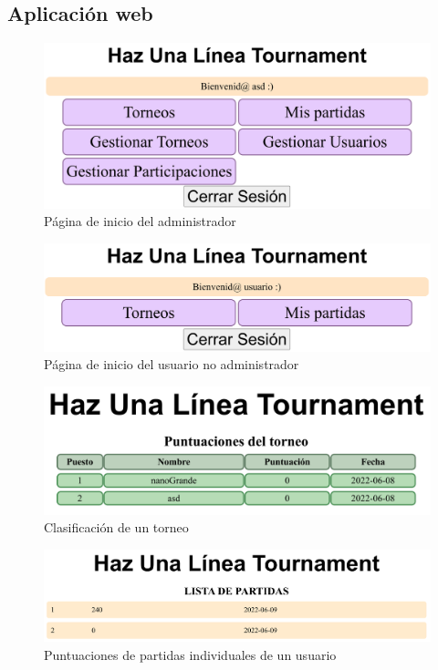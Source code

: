 \documentclass{article}
\begin{document}
\subsection{Aplicación web}
\begin{figure}[H]
  \includegraphics[width=\textwidth]{imagenes/inicioAdmin.png}
  \caption{Página de inicio del administrador} 
\end{figure}

\begin{figure}[H]
  \includegraphics[width=\textwidth]{imagenes/inicioUser.png}
  \caption{Página de inicio del usuario no administrador} 
\end{figure}

\begin{figure}[H]
  \includegraphics[width=\textwidth]{imagenes/torneoPuntuacion.png}
  \caption{Clasificación de un torneo} 
\end{figure}

\begin{figure}[H]
  \includegraphics[width=\textwidth]{imagenes/puntuacion.png}
  \caption{Puntuaciones de partidas individuales de un usuario} 
\end{figure}
\end{document}
